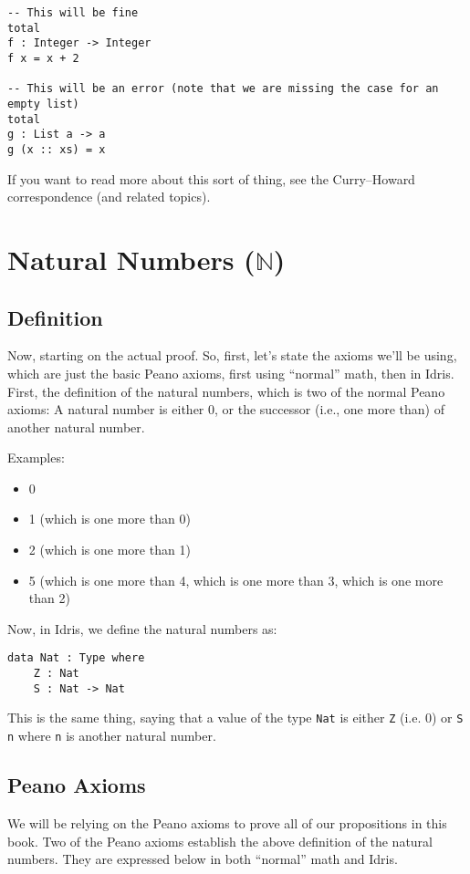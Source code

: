 \documentclass{article}
\newcommand{\inline}[1]{\texttt{#1}}
\begin{document}
\begin{verbatim}
-- This will be fine
total
f : Integer -> Integer
f x = x + 2

-- This will be an error (note that we are missing the case for an empty list)
total
g : List a -> a
g (x :: xs) = x
\end{verbatim}

If you want to read more about this sort of thing, see the Curry--Howard correspondence (and related topics).

\section{Natural Numbers ($\mathbb{N}$)}
\subsection{Definition}
Now, starting on the actual proof.
So, first, let's state the axioms we'll be using, which are just the basic Peano axioms, first using ``normal'' math, then in Idris.
First, the definition of the natural numbers, which is two of the normal Peano axioms:
A natural number is either 0, or the successor (i.e., one more than) of another natural number.

Examples:
\begin{itemize}
    \item 0
    \item 1 (which is one more than 0)
    \item 2 (which is one more than 1)
    \item 5 (which is one more than 4, which is one more than 3, which is one more than 2)
\end{itemize}

Now, in Idris, we define the natural numbers as:
\begin{verbatim}
data Nat : Type where
    Z : Nat
    S : Nat -> Nat
\end{verbatim}

This is the same thing, saying that a value of the type \inline{Nat} is either \inline{Z} (i.e. 0) or \inline{S n} where \inline{n} is another natural number.

\subsection{Peano Axioms}
We will be relying on the Peano axioms to prove all of our propositions in this book.
Two of the Peano axioms establish the above definition of the natural numbers.
They are expressed below in both ``normal'' math and Idris.
\end{document}
